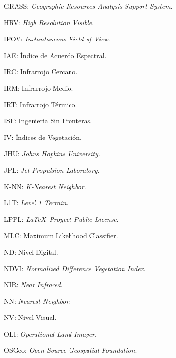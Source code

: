 GRASS: \textit{Geographic Resources Analysis Support System}.

HRV: \textit{High Resolution Visible}.

IFOV: \textit{Instantaneous Field of View}.

IAE: Índice de Acuerdo Espectral.

IRC: Infrarrojo Cercano.

IRM: Infrarrojo Medio.

IRT: Infrarrojo Térmico.

ISF: Ingeniería Sin Fronteras.

IV: Índices de Vegetación.

JHU: \textit{Johns Hopkins University}.

JPL: \textit{Jet Propulsion Laboratory}.

K-NN: \textit{K-Nearest Neighbor}.

L1T: \textit{Level 1 Terrain}.

LPPL: \textit{\LaTeX\ Proyect Public License}.

MLC: Maximum Likelihood Classifier.

ND: Nivel Digital.

NDVI: \textit{Normalized Difference Vegetation Index}.

NIR: \textit{Near Infrared}.

NN: \textit{Nearest Neighbor}.

NV: Nivel Visual.

OLI: \textit{Operational Land Imager}.

OSGeo: \textit{Open Source Geospatial Foundation}.

